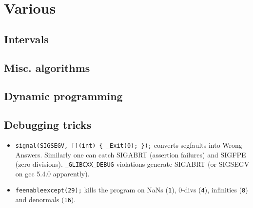 \chapter{Various}

\section{Intervals}
    
\section{Misc. algorithms}

\section{Dynamic programming}

\section{Debugging tricks}
	\begin{itemize}
		\item \texttt{signal(SIGSEGV, [](int) \{ \_Exit(0); \});} converts segfaults into Wrong Answers.
			Similarly one can catch SIGABRT (assertion failures) and SIGFPE (zero divisions).
			\texttt{\_GLIBCXX\_DEBUG} violations generate SIGABRT (or SIGSEGV on gcc 5.4.0 apparently).
		\item \texttt{feenableexcept(29);} kills the program on NaNs (\texttt 1), 0-divs (\texttt 4), infinities (\texttt 8) and denormals (\texttt{16}).
	\end{itemize}

